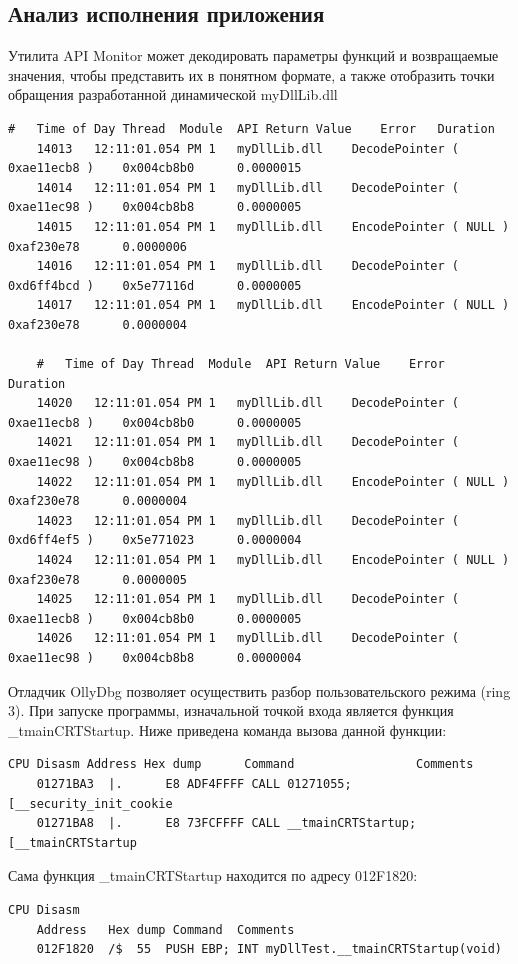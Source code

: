 \subsection{Анализ исполнения приложения}

Утилита API Monitor может декодировать параметры функций и возвращаемые значения, чтобы представить их в понятном формате, а также отобразить точки обращения разработанной динамической myDllLib.dll
\begin{Verbatim}[frame=single]
	#	Time of Day	Thread	Module	API	Return Value	Error	Duration
	14013	12:11:01.054 PM	1	myDllLib.dll	DecodePointer ( 0xae11ecb8 )	0x004cb8b0		0.0000015
	14014	12:11:01.054 PM	1	myDllLib.dll	DecodePointer ( 0xae11ec98 )	0x004cb8b8		0.0000005
	14015	12:11:01.054 PM	1	myDllLib.dll	EncodePointer ( NULL )	0xaf230e78		0.0000006
	14016	12:11:01.054 PM	1	myDllLib.dll	DecodePointer ( 0xd6ff4bcd )	0x5e77116d		0.0000005
	14017	12:11:01.054 PM	1	myDllLib.dll	EncodePointer ( NULL )	0xaf230e78		0.0000004
				
	#	Time of Day	Thread	Module	API	Return Value	Error	Duration
	14020	12:11:01.054 PM	1	myDllLib.dll	DecodePointer ( 0xae11ecb8 )	0x004cb8b0		0.0000005
	14021	12:11:01.054 PM	1	myDllLib.dll	DecodePointer ( 0xae11ec98 )	0x004cb8b8		0.0000005
	14022	12:11:01.054 PM	1	myDllLib.dll	EncodePointer ( NULL )	0xaf230e78		0.0000004
	14023	12:11:01.054 PM	1	myDllLib.dll	DecodePointer ( 0xd6ff4ef5 )	0x5e771023		0.0000004
	14024	12:11:01.054 PM	1	myDllLib.dll	EncodePointer ( NULL )	0xaf230e78		0.0000005
	14025	12:11:01.054 PM	1	myDllLib.dll	DecodePointer ( 0xae11ecb8 )	0x004cb8b0		0.0000005
	14026	12:11:01.054 PM	1	myDllLib.dll	DecodePointer ( 0xae11ec98 )	0x004cb8b8		0.0000004
\end{Verbatim}

Отладчик OllyDbg позволяет осуществить разбор пользовательского режима (ring 3). При запуске программы, изначальной точкой входа является функция \_tmainCRTStartup. Ниже приведена команда вызова данной функции:
\begin{Verbatim}[frame=single]
	CPU Disasm Address Hex dump      Command                 Comments
	01271BA3  |.      E8 ADF4FFFF CALL 01271055;          [__security_init_cookie
	01271BA8  |.      E8 73FCFFFF CALL __tmainCRTStartup; [__tmainCRTStartup
\end{Verbatim}

Сама функция \_tmainCRTStartup находится по адресу 012F1820:
\begin{Verbatim}[frame=single]
	CPU Disasm
	Address   Hex dump Command  Comments
	012F1820  /$  55  PUSH EBP; INT myDllTest.__tmainCRTStartup(void)	
\end{Verbatim}

